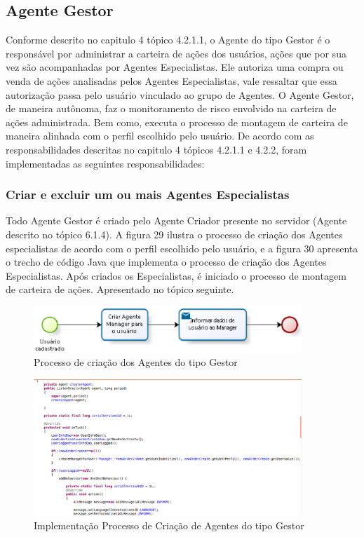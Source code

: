 \subsection{Agente Gestor}

Conforme descrito no capitulo 4 tópico 4.2.1.1, o Agente do tipo Gestor é o responsável por administrar a carteira de ações dos usuários, ações que por sua vez são acompanhadas por Agentes Especialistas. Ele autoriza uma compra ou venda de ações analisadas pelos Agentes Especialistas, vale ressaltar que essa autorização passa pelo usuário vinculado ao grupo de Agentes. O Agente Gestor, de maneira autônoma, faz o monitoramento de risco envolvido na carteira de ações administrada. Bem como, executa o processo de montagem de carteira de maneira alinhada com o perfil escolhido pelo usuário. De acordo com as responsabilidades descritas no capitulo 4 tópicos 4.2.1.1 e 4.2.2, foram implementadas as seguintes responsabilidades: 

\subsubsection{Criar e excluir um ou mais Agentes Especialistas}

Todo Agente Gestor é criado pelo Agente Criador presente no servidor (Agente descrito no tópico 6.1.4). A figura 29 ilustra o processo de criação dos Agentes especialistas de acordo com o perfil escolhido pelo usuário, e a figura 30 apresenta o trecho de código Java que implementa o processo de criação dos Agentes Especialistas.  Após criados os Especialistas, é iniciado o processo de montagem de carteira de ações. Apresentado no tópico seguinte.

\begin{figure}[h]
\centering
\label{f29}
\includegraphics[width=0.9\textwidth]{figuras/f29}
\caption{Processo de criação dos Agentes do tipo Gestor }
\end{figure}

\begin{figure}[h]
\centering
\label{f30}
\includegraphics[width=0.9\textwidth]{figuras/f30}
\caption{Implementação Processo de Criação de Agentes do tipo Gestor}
\end{figure}

